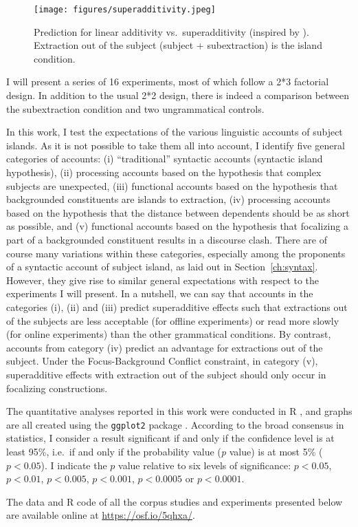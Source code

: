 \begin{figure}[ht]
	\centering
	\texttt{[image: figures/superadditivity.jpeg]}
	\caption{Prediction for linear additivity vs.\ superadditivity (inspired by \citealt[86]{Sprouse.2012}). Extraction out of the subject (subject + subextraction) is the island condition.}
	\label{fig:superadditivity}
\end{figure}

I will present a series of 16 experiments, most of which follow a 2*3 factorial design. In addition to the usual 2*2 design, there is indeed a comparison between the subextraction condition and two ungrammatical controls. 

In this work, I test the expectations of the various linguistic accounts of subject islands. As it is not possible to take them all into account, I identify five general categories of accounts: (i) ``traditional'' syntactic accounts (syntactic island hypothesis), (ii) processing accounts based on the hypothesis that complex subjects are unexpected, (iii) functional accounts based on the hypothesis that backgrounded constituents are islands to extraction, (iv) processing accounts based on the hypothesis that the distance between dependents should be as short as possible, and (v) functional accounts based on the hypothesis that focalizing a part of a backgrounded constituent results in a discourse clash. There are of course many variations within these categories, especially among the proponents of a syntactic account of subject island, as laid out in Section~\ref{ch:syntax}. However, they give rise to similar general expectations with respect to the experiments I will present. In a nutshell, we can say that accounts in the categories (i), (ii) and (iii) predict superadditive effects such that extractions out of the subjects are less acceptable (for offline experiments) or read more slowly (for online experiments) than the other grammatical conditions. By contrast, accounts from category (iv) predict an advantage for extractions out of the subject. Under the Focus-Background Conflict constraint, in category (v), superadditive effects with extraction out of the subject should only occur in focalizing constructions. 


The quantitative analyses reported in this work were conducted in R \citep[version~3.6.3]{R}, and graphs are all created using the \texttt{ggplot2} package \citep{Wickham.2016}. According to the broad consensus in statistics, I consider a result significant if and only if the confidence level is at least 95\%, i.e.\ if and only if the probability value (\emph{p} value) is at most 5\% ($p<0.05$). I indicate the $p$ value relative to six levels of significance: $p<0.05$, $p<0.01$, $p<0.005$, $p<0.001$, $p<0.0005$ or $p<0.0001$. 

The data and R code of all the corpus studies and experiments presented below are available online at \url{https://osf.io/5qhxa/}.
